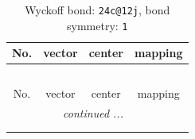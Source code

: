 \documentclass[fleqn,8pt]{jsarticle}
\begin{document}
\renewcommand{\arraystretch}{1.2}
\begin{longtable}{cccc}
\caption{Wyckoff bond: {\tt 24c@12j}, bond symmetry: {\tt 1}}
 \\
 \hline \hline
No. & vector & center & mapping \\ \hline \endfirsthead

\multicolumn{3}{l}{\tablename\ \thetable{}} \\
 \hline \hline
No. & vector & center & mapping \\ \hline \endhead

 \hline \hline
\multicolumn{3}{r}{\footnotesize\it continued ...} \\ \endfoot

 \hline \hline
\multicolumn{3}{r}{} \\ \endlastfoot


\end{longtable}
\end{document}
